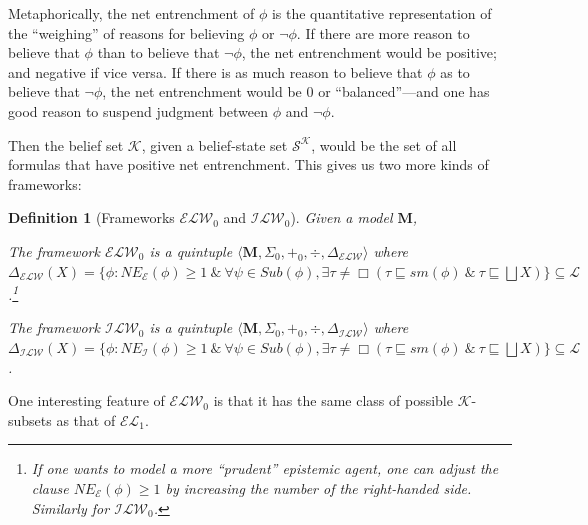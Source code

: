 \documentclass[12pt]{article}
\newtheorem{definition}{Definition}[section]
\newcommand{\K}{\mathcal{K}}
\newcommand{\SK}{\mathcal{S}^\mathcal{K}}
\begin{document}
Metaphorically, the net entrenchment of $\phi$ is the quantitative representation of the ``weighing'' of reasons for believing $\phi$ or $\lnot \phi$. If there are more reason to believe that $\phi$ than to believe that $\lnot \phi$, the net entrenchment would be positive; and negative if vice versa. If there is as much reason to believe that $\phi$ as to believe that $\lnot \phi$, the net entrenchment would be 0 or ``balanced''---and one has good reason to suspend judgment between $\phi$ and $\lnot \phi$. 
\par
Then the belief set $\K$, given a belief-state set $\SK$, would be the set of all formulas that have positive net entrenchment. This gives us two more kinds of frameworks:
\begin{definition}[Frameworks $\mathcal{ELW}_0$ and $\mathcal{ILW}_0$] Given a model $\bm{M}$, 
    \par
    The framework $\mathcal{ELW}_0$ is a quintuple $\langle \bm{M}, \Sigma_0, +_0, \div, \Delta_\mathcal{ELW} \rangle$ where $\Delta_\mathcal{ELW} (X) = \{\phi: NE_\mathcal{E}(\phi) \geq 1 \ \& \ \forall \psi \in Sub(\phi), \exists \tau \neq \Box (\tau \sqsubseteq sm(\phi) \ \& \ \tau \sqsubseteq \bigsqcup X)\} \subseteq \mathcal{L}$.\footnote{If one wants to model a more ``prudent'' epistemic agent, one can adjust the clause $NE_\mathcal{E}(\phi) \geq 1$ by increasing the number of the right-handed side. Similarly for $\mathcal{ILW}_0$. }
    \par
    The framework $\mathcal{ILW}_0$ is a quintuple $\langle \bm{M}, \Sigma_0, +_0, \div, \Delta_\mathcal{ILW} \rangle$ where $\Delta_\mathcal{ILW} (X) = \{\phi: NE_\mathcal{I}(\phi) \geq 1 \ \& \ \forall \psi \in Sub(\phi), \exists \tau \neq \Box (\tau \sqsubseteq sm(\phi) \ \& \ \tau \sqsubseteq \bigsqcup X)\} \subseteq \mathcal{L}$.
\end{definition}
One interesting feature of $\mathcal{ELW}_0$ is that it has the same class of possible $\K$-subsets as that of $\mathcal{EL}_1$. 
\end{document}
